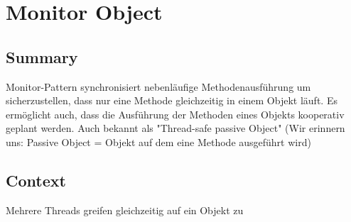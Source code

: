 \chapter{Monitor Object}

\section{Summary}
Monitor-Pattern synchronisiert nebenläufige Methodenausführung um sicherzustellen, dass nur eine Methode gleichzeitig in einem Objekt läuft. Es ermöglicht auch, dass die Ausführung der Methoden eines Objekts kooperativ geplant werden.
Auch bekannt als "Thread-safe passive Object" (Wir erinnern uns: Passive Object = Objekt auf dem eine Methode ausgeführt wird)

\section{Context}
Mehrere Threads greifen gleichzeitig auf ein Objekt zu

